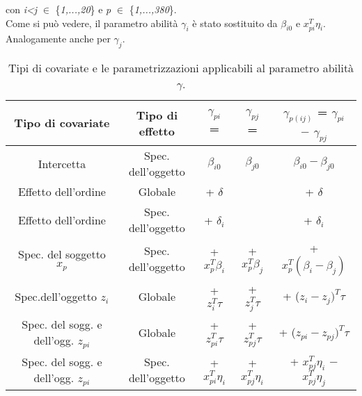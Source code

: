 con \emph{i<j} $\in$ \{\emph{1,...,20}\} e \emph{p} $\in$ \{\emph{1,...,380}\}.\\
Come si può vedere, il parametro abilità $\gamma_{i}$ è stato sostituito da $\beta_{i0}$ e $ x^T_{pi}\eta_i$. Analogamente anche per $\gamma_{j}$.
\begin{table}[!htb]%
	
	\renewcommand{\arraystretch}{1.7}
	\centering
	\begin{tabular}{|c| c| c |c |c|}
		\hline	
		\rowcolor{SchoolColor2}
		\textbf{Tipo di covariate} & \textbf{Tipo di effetto} & \textbf{$\gamma_{pi}$ =}& \textbf{$\gamma_{pj}$ =} & \textbf{$\gamma_{p(ij)}$ = $\gamma_{pi}$ $-$ $\gamma_{pj}$} \\	
		\hline			
		Intercetta & Spec. dell'oggetto & $\beta_{i0}$ & $\beta_{j0}$ & $\beta_{i0} - \beta_{j0}$\\
		Effetto dell'ordine & Globale & + $\delta$ &  & + $\delta$ \\
		Effetto dell'ordine & Spec. dell'oggetto &  + $\delta_i$ &  &  + $\delta_i$\\
		Spec. del soggetto $x_p$ & Spec. dell'oggetto & + $x^T_p\beta_i$ & + $x^T_p\beta_j$ & + $x^T_p(\beta_i - \beta_j)$\\
		Spec.dell'oggetto  $z_i$ & Globale & + $z^T_{i}\tau$ & + $z^T_{j}\tau$ & + ($z_{i} - z_{j})^T\tau$\\
		Spec. del sogg. e dell'ogg. $z_{pi}$ & Globale & + $z^T_{pi}\tau$ & + $z^T_{pj}\tau$ & + ($z_{pi} - z_{pj})^T\tau$\\
		Spec. del sogg. e dell'ogg. $z_{pi}$ & Spec. dell'oggetto & + $x^T_{pi}\eta_i$ & + $x^T_{pj}\eta_i$& + $x^T_{pj}\eta_i$ $-$ $x^T_{pj}\eta_j$\\
		\hline
		
		
	\end{tabular} \hbox{}
	
	\caption{Tipi di covariate e le parametrizzazioni applicabili al parametro abilità $\gamma$.} \label{tab:type}
\end{table}

